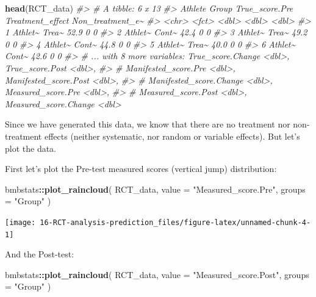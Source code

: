 \documentclass[
]{book}
\newenvironment{Shaded}{\begin{snugshade}}{\end{snugshade}}
\newcommand{\CommentTok}[1]{\textcolor[rgb]{0.56,0.35,0.01}{\textit{#1}}}
\newcommand{\DataTypeTok}[1]{\textcolor[rgb]{0.13,0.29,0.53}{#1}}
\newcommand{\KeywordTok}[1]{\textcolor[rgb]{0.13,0.29,0.53}{\textbf{#1}}}
\newcommand{\NormalTok}[1]{#1}
\newcommand{\OperatorTok}[1]{\textcolor[rgb]{0.81,0.36,0.00}{\textbf{#1}}}
\newcommand{\StringTok}[1]{\textcolor[rgb]{0.31,0.60,0.02}{#1}}
\begin{document}
\begin{Shaded}
\begin{Highlighting}[]
\KeywordTok{head}\NormalTok{(RCT\_data)}
\CommentTok{\#> \# A tibble: 6 x 13}
\CommentTok{\#>   Athlete Group True\_score.Pre Treatment\_effect Non\_treatment\_e\textasciitilde{}}
\CommentTok{\#>   <chr>   <fct>          <dbl>            <dbl>            <dbl>}
\CommentTok{\#> 1 Athlet\textasciitilde{} Trea\textasciitilde{}           52.9                0                0}
\CommentTok{\#> 2 Athlet\textasciitilde{} Cont\textasciitilde{}           42.4                0                0}
\CommentTok{\#> 3 Athlet\textasciitilde{} Trea\textasciitilde{}           49.2                0                0}
\CommentTok{\#> 4 Athlet\textasciitilde{} Cont\textasciitilde{}           44.8                0                0}
\CommentTok{\#> 5 Athlet\textasciitilde{} Trea\textasciitilde{}           40.0                0                0}
\CommentTok{\#> 6 Athlet\textasciitilde{} Cont\textasciitilde{}           42.6                0                0}
\CommentTok{\#> \# ... with 8 more variables: True\_score.Change <dbl>, True\_score.Post <dbl>,}
\CommentTok{\#> \#   Manifested\_score.Pre <dbl>, Manifested\_score.Post <dbl>,}
\CommentTok{\#> \#   Manifested\_score.Change <dbl>, Measured\_score.Pre <dbl>,}
\CommentTok{\#> \#   Measured\_score.Post <dbl>, Measured\_score.Change <dbl>}
\end{Highlighting}
\end{Shaded}

Since we have generated this data, we know that there are no treatment nor non-treatment effects (neither systematic, nor random or variable effects). But let's plot the data.

First let's plot the Pre-test measured scores (vertical jump) distribution:

\begin{Shaded}
\begin{Highlighting}[]
\NormalTok{bmbstats}\OperatorTok{::}\KeywordTok{plot\_raincloud}\NormalTok{(}
\NormalTok{  RCT\_data,}
  \DataTypeTok{value =} \StringTok{"Measured\_score.Pre"}\NormalTok{,}
  \DataTypeTok{groups =} \StringTok{"Group"}
\NormalTok{)}
\end{Highlighting}
\end{Shaded}

\begin{center}\texttt{[image: 16-RCT-analysis-prediction\_files/figure-latex/unnamed-chunk-4-1]} \end{center}

And the Post-test:

\begin{Shaded}
\begin{Highlighting}[]
\NormalTok{bmbstats}\OperatorTok{::}\KeywordTok{plot\_raincloud}\NormalTok{(}
\NormalTok{  RCT\_data,}
  \DataTypeTok{value =} \StringTok{"Measured\_score.Post"}\NormalTok{,}
  \DataTypeTok{groups =} \StringTok{"Group"}
\NormalTok{)}
\end{Highlighting}
\end{Shaded}
\end{document}
